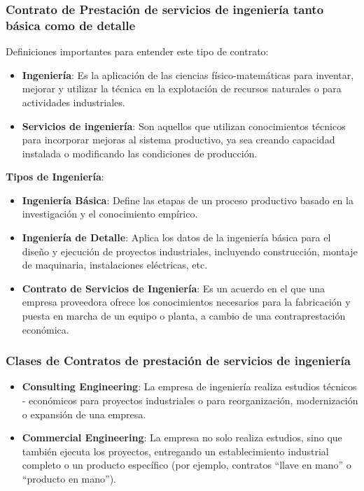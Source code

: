 \documentclass{templateNote}
\begin{document}
\subsubsection{Contrato de Prestación de servicios de ingeniería tanto básica como de detalle}
\noindent Definiciones importantes para entender este tipo de contrato:
\begin{itemize}
    \item \textbf{Ingeniería}: Es la aplicación de las ciencias físico-matemáticas para inventar, mejorar y utilizar la técnica en la explotación de recursos naturales o para actividades industriales.
    \item \textbf{Servicios de ingeniería}: Son aquellos que utilizan conocimientos técnicos para incorporar mejoras al sistema productivo, ya sea creando capacidad instalada o modificando las condiciones de producción.
\end{itemize}

\noindent\textbf{Tipos de Ingeniería}:
\begin{itemize}
    \item \textbf{Ingeniería Básica}: Define las etapas de un proceso productivo basado en la investigación y el conocimiento empírico.
    \item \textbf{Ingeniería de Detalle}: Aplica los datos de la ingeniería básica para el diseño y ejecución de proyectos industriales, incluyendo construcción, montaje de maquinaria, instalaciones eléctricas, etc.
    \item \textbf{Contrato de Servicios de Ingeniería}: Es un acuerdo en el que una empresa proveedora ofrece los conocimientos necesarios para la fabricación y puesta en marcha de un equipo o planta, a cambio de una contraprestación económica.
\end{itemize}

\subsubsection*{Clases de Contratos de prestación de servicios de ingeniería}

\begin{itemize}
    \item \textbf{Consulting Engineering}: La empresa de ingeniería realiza estudios técnicos - económicos para proyectos industriales o para reorganización, modernización o expansión de una empresa.
    \item \textbf{Commercial Engineering}: La empresa no solo realiza estudios, sino que también ejecuta los proyectos, entregando un establecimiento industrial completo o un producto específico (por ejemplo, contratos ``llave en mano'' o ``producto en mano'').
\end{itemize}
\end{document}
